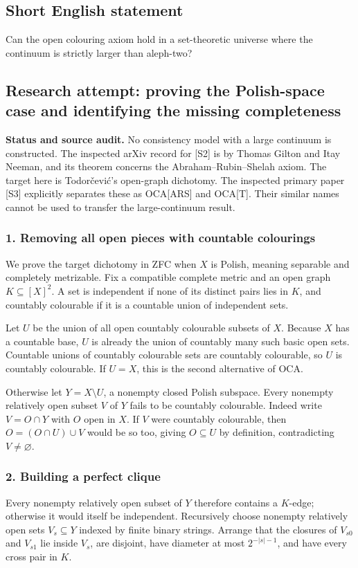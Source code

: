 \documentclass[11pt,a4paper]{article}
\begin{document}
\subsection{Short English statement}

Can the open colouring axiom hold in a set-theoretic universe where the continuum is strictly larger than aleph-two?

\subsection{Research attempt: proving the Polish-space case and identifying the missing completeness}
\textbf{Status and source audit.} No consistency model with a large continuum is constructed. The inspected arXiv record for [S2] is by Thomas Gilton and Itay Neeman, and its theorem concerns the Abraham--Rubin--Shelah axiom. The target here is Todorčević's open-graph dichotomy. The inspected primary paper [S3] explicitly separates these as OCA[ARS] and OCA[T]. Their similar names cannot be used to transfer the large-continuum result.

\subsubsection{1. Removing all open pieces with countable colourings}
We prove the target dichotomy in ZFC when $X$ is Polish, meaning separable and completely metrizable. Fix a compatible complete metric and an open graph $K\subseteq[X]^2$. A set is independent if none of its distinct pairs lies in $K$, and countably colourable if it is a countable union of independent sets.

Let $U$ be the union of all open countably colourable subsets of $X$. Because $X$ has a countable base, $U$ is already the union of countably many such basic open sets. Countable unions of countably colourable sets are countably colourable, so $U$ is countably colourable. If $U=X$, this is the second alternative of OCA.

Otherwise let $Y=X\setminus U$, a nonempty closed Polish subspace. Every nonempty relatively open subset $V$ of $Y$ fails to be countably colourable. Indeed write $V=O\cap Y$ with $O$ open in $X$. If $V$ were countably colourable, then $O=(O\cap U)\cup V$ would be so too, giving $O\subseteq U$ by definition, contradicting $V\ne\varnothing$.

\subsubsection{2. Building a perfect clique}
Every nonempty relatively open subset of $Y$ therefore contains a $K$-edge; otherwise it would itself be independent. Recursively choose nonempty relatively open sets $V_s\subseteq Y$ indexed by finite binary strings. Arrange that the closures of $V_{s0}$ and $V_{s1}$ lie inside $V_s$, are disjoint, have diameter at most $2^{-|s|-1}$, and have every cross pair in $K$.
\end{document}
